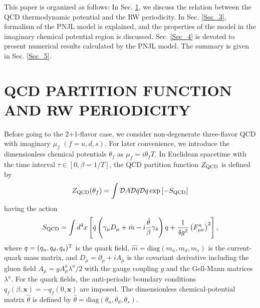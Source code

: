 \documentclass[prd,superscriptaddress,unsortedaddress,
twocolumn,showpacs,preprintnumbers,amsmath,amssymb]{revtex4}
\begin{document}
This paper is organized as follows:
In Sec. \ref{Sec_2}, we discuss the relation
between the QCD thermodynamic potential and the RW periodicity.
In Sec. \ref{Sec_3}, formalism of the PNJL model is explained,
and the properties of the model in the
imaginary chemical potential region is discussed.
Sec. \ref{Sec_4} is devoted to present numerical results
calculated by the PNJL model.
The summary is given in Sec. \ref{Sec_5}.


\section{QCD PARTITION FUNCTION AND RW PERIODICITY}
\label{Sec_2}
Before going to the 2+1-flavor case,
we consider non-degenerate three-flavor QCD with
imaginary $\mu_{f}$ $(f=u,d,s)$.
For later convenience,
we introduce the dimensionless chemical potentials
$\theta_{f}$ as $\mu_{f}=i\theta_{f}T$.
In Euclidean spacetime with the time interval $\tau\in[0,\beta=1/T]$,
the QCD partition function $Z_{\rm QCD}$ is defined by
 \begin{align}
 Z_{\rm QCD}(\theta_{f})=\int\mathcal{D}A\mathcal{D}\bar{q}\mathcal{D}q
 \exp\left[-S_{\rm QCD}\right]
 \end{align}
 having the action
 \begin{eqnarray}
   S_{\rm QCD}=\int d^4 x
 \left[
 \bar{q}\left(\gamma_{\mu}D_{\mu}+\hat{m}-i\frac{\hat{\theta}}{\beta}\gamma_{4}\right)q
 +\frac{1}{4g^2}\left(F^a_{\mu\nu}\right)^2
           \right],
 \label{action_QCD}
 \end{eqnarray}
where $q=(q_{u},q_{d},q_{s})^{\rm T}$ is the quark field,
$\hat{m}=\textrm{diag}(m_{u},m_{d},m_{s})$
is the current-quark mass matrix, and $D_{\mu}=\partial_{\mu}+iA_{\mu}$ is the
covariant derivative including the gluon field
$A_{\mu}=gA^{a}_{\mu}\lambda^a/2$
with the gauge coupling $g$ and the Gell-Mann matrices $\lambda^a$.
For the quark fields, the anti-periodic boundary conditions
$q_{f}(\beta,\mathbf{x})=-q_{f}(0,\mathbf{x})$ are imposed.
The dimensionless chemical-potential matrix $\hat{\theta}$ is defined by
$\hat{\theta}=\textrm{diag}(\theta_{u},\theta_{d},\theta_{s})$.
\end{document}
